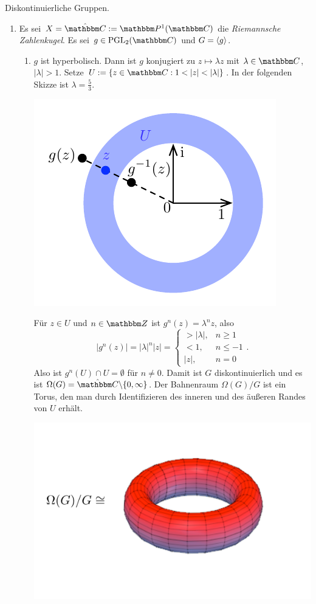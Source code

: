 \documentclass[a4paper, 12pt, twoside]{article}
\begin{document}
\BSP Diskontinuierliche Gruppen.
\begin{enumerate}
\item Es sei $X=\hat{\CC}:=\PP^1(\CC)$ die
\emph{Riemannsche Zahlenkugel}.
Es sei $g\in\PGL_2(\CC)$ und $G=\langle g\rangle$.
\begin{enumerate}
\item $g$ ist hyperbolisch.
Dann ist $g$ konjugiert zu $z\mapsto \lambda z$ mit $\lambda\in\CC$,
$|\lambda|>1$.
Setze $U:=\{z\in\CC : 1<|z|<|\lambda| \}$.
In der folgenden Skizze ist $\lambda=\frac{5}{3}$.
\begin{center}
	\includegraphics{grugraImages/UinC}
\end{center}
Für $z\in U$ und $n\in\ZZ$ ist $g^n(z)=\lambda^n z$,
also
\[
|g^n(z)|=|\lambda|^n |z|=
\left\{
\begin{matrix}
>|\lambda|, & n\geq 1 \\
< 1, & n\leq -1 \\
|z|, & n=0
\end{matrix}
\right..
\]
Also ist $g^n(U)\cap U=\emptyset$ für $n\neq 0$.
Damit ist $G$ diskontinuierlich und es ist
$\Omega(G)=\hat{\CC}\backslash\{0,\infty\}$.
Der Bahnenraum $\Omega(G)/G$ ist ein Torus, den man durch
Identifizieren des inneren und des äußeren Randes von $U$
erhält.
\begin{center}
	\includegraphics{grugraImages/Torus.pdf}

\end{center}
\end{enumerate}
\end{enumerate}
\end{document}
